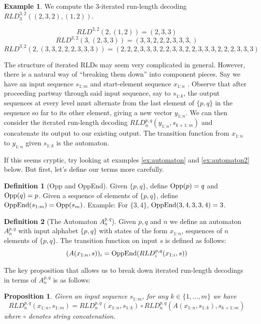 \documentclass[11pt]{article}
\theoremstyle{plain}
\newtheorem{proposition}{Proposition}
\theoremstyle{definition}
\newtheorem{definition}{Definition}
\newtheorem{example}{Example}
\begin{document}
\begin{example}

We compute the 3-iterated run-length decoding $RLD^{3, 2}_3((2, 3, 2), (1, 2))$.

$$RLD^{3, 2}(2, (1, 2)) = (2, 3, 3)$$
$$RLD^{3,2}(3, (2, 3, 3)) = (3, 3, 2, 2, 2, 3, 3, 3,)$$ 
$$RLD^{3, 2}(2,(3, 3, 2, 2, 2, 3, 3, 3) ) = (2, 2, 2, 3, 3, 3, 2, 2, 3, 3, 2, 2, 3, 3, 3, 2, 2, 2, 3, 3, 3) $$
\end{example}

The structure of iterated RLDs may seem very complicated in general. However, there is a natural way of ``breaking them down'' into component pieces. Say we have an input sequence $s_{1:m}$ and start-element sequence $x_{1:n}$ . Observe that after proceeding partway through said input sequence, say to $s_{1:k}$, the output sequences at every level must alternate from the last element of $\{p, q\}$ in the sequence so far to its other element, giving a new vector $y_{1:n}$. We can then consider the iterated run-length decoding $RLD^{p,q}_n(y_{1:n}, s_{k+1:m})$ and concatenate its output to our existing output. The transition function from $x_{1:n}$ to $y_{1:n}$ given $s_{1:k}$ is the automaton.

If this seems cryptic, try looking at examples \ref{ex:automaton} and \ref{ex:automaton2} below. But first, let's define our terms more carefully.

\begin{definition}[Opp and OppEnd]
Given $\{p, q\}$, define $\textnormal{Opp}(p) = q$ and $\textnormal{Opp}(q) = p$.
Given a sequence of elements of $\{p,q\}$, define $\textnormal{OppEnd}(s_{1:m}) = \textnormal{Opp}(s_m)$. 
Example: For $\{3, 4\}$, $\textnormal{OppEnd}(3, 4, 3, 3, 4) = 3$.
\end{definition}

\begin{definition}[The Automaton $A^{p,q}_n$]
Given $p, q$ and $n$ we define an automaton $A^{p,q}_n$ with input alphabet $\{p, q\}$ with states of the form $x_{1:n}$, sequences of $n$ elements of $\{p, q\}$. The transition function on input $s$ is defined as follows:
$$(A(x_{1:n}, s))_i = \textnormal{OppEnd}(RLD^{p,q}_i(x_{1:i}, s))$$
\end{definition}

The key proposition that allows us to break down iterated run-length decodings in terms of $A^{p,q}_n$ is as follows:

\begin{proposition} \label{prop:automatonprop}
Given an input sequence $s_{1:m}$, for any $k \in \{1,...,m\}$ we have 
$$RLD^{p,q}_n(x_{1:n}, s_{1:m}) = RLD^{p,q}_n(x_{1:n}, s_{1:k}) \circ RLD^{p,q}_n(A(x_{1:n}, s_{1:k}), s_{k+1:m})$$
where $\circ$ denotes string concatenation.

\end{proposition}
\end{document}
